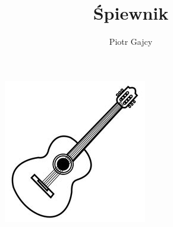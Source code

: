\documentclass{article}
\title{Śpiewnik}
\author{Piotr Gajcy}
\begin{document}
  
\begin{titlepage}
  \vspace*{1cm}
  \begin{center}
    \vspace{3.5cm}         
    \begin{figure}[h]
		\centering
		\includegraphics[scale=0.6]{guitar}
	\end{figure}
\end{center}
    \vfill
   \footnotesize{ } 
\end{titlepage}
  
\end{document}
